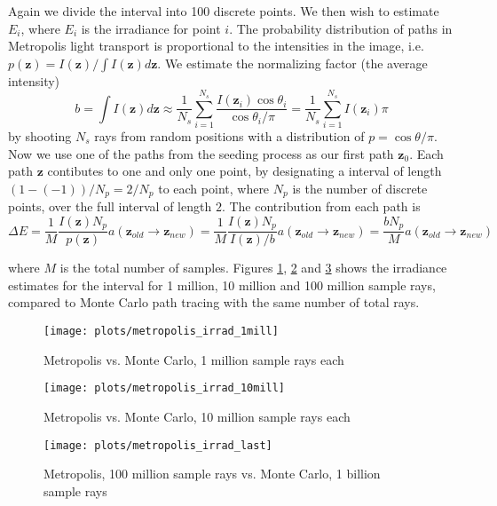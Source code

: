 \documentclass{article} %
\begin{document}
Again we divide the interval into 100 discrete points. We then wish to estimate $E_i$, where $E_i$ is the irradiance for point $i$. The probability distribution of paths in Metropolis light transport is proportional to the intensities in the image, i.e. $p(\mathbf{z}) = I(\mathbf{z})/{\int I(\mathbf{z})d\mathbf{z}}$. We estimate the normalizing factor (the average intensity) 
$$
b=\int I(\mathbf{z})d\mathbf{z}\approx \frac{1}{N_s}\sum_{i=1}^{N_s} \frac{I(\mathbf{z}_i) \cos \theta_i}{\cos \theta_i/\pi} = \frac{1}{N_s}\sum_{i=1}^{N_s} I(\mathbf{z}_i)\pi
$$
by shooting $N_s$ rays from random positions with a distribution of $p = \cos \theta/\pi$. Now we use one of the paths from the seeding process as our first path $\mathbf{z}_0$. Each path $\mathbf{z}$ contibutes to one and only one point, by designating a interval of length $(1- (-1))/N_p=2/N_p$ to each point, where $N_p$ is the number of discrete points, over the full interval of length $2$. The contribution from each path is 
$$\Delta E = \frac{1}{M} \frac{I(\mathbf{z})N_p}{p(\mathbf{z})}a(\mathbf{z}_{old}\to \mathbf{z}_{new}) = \frac{1}{M} \frac{I(\mathbf{z})N_p}{I(\mathbf{z})/b} a(\mathbf{z}_{old}\to \mathbf{z}_{new}) = \frac{bN_p}{M} a(\mathbf{z}_{old}\to \mathbf{z}_{new})$$ 

where $M$ is the total number of samples. Figures \ref{fig:metropolis_irrad1}, \ref{fig:metropolis_irrad10} and \ref{fig:metropolis_irrad100} shows the irradiance estimates for the interval for 1 million, 10 million and 100 million sample rays, compared to Monte Carlo path tracing with the same number of total rays.

\begin{figure}[h]
    \centering
    \texttt{[image: plots/metropolis\_irrad\_1mill]}\\
    \caption{Metropolis vs. Monte Carlo, 1 million sample rays each}
    \label{fig:metropolis_irrad1}
\end{figure}

\begin{figure}
    \centering
    \texttt{[image: plots/metropolis\_irrad\_10mill]}\\
    \caption{Metropolis vs. Monte Carlo, 10 million sample rays each}
    \label{fig:metropolis_irrad10}
\end{figure}

\begin{figure}
    \centering
    \texttt{[image: plots/metropolis\_irrad\_last]}\\
    \caption{Metropolis, 100 million sample rays vs. Monte Carlo, 1 billion sample rays}
    \label{fig:metropolis_irrad100}
\end{figure}
\end{document}
